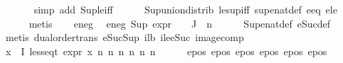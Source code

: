 \begin{isabellebody}
\ \ \ \ \ \isamarkupfalse%
\ {\isacharparenleft}{\kern0pt}simp\ add{\isacharcolon}{\kern0pt}\ Sup{\isacharunderscore}{\kern0pt}le{\isacharunderscore}{\kern0pt}iff{\isacharparenright}{\kern0pt}\isanewline
\ \ \ \ \isamarkupfalse%
\ Sup{\isacharunderscore}{\kern0pt}union{\isacharunderscore}{\kern0pt}distrib\ le{\isacharunderscore}{\kern0pt}sup{\isacharunderscore}{\kern0pt}iff\ sup{\isacharunderscore}{\kern0pt}enat{\isacharunderscore}{\kern0pt}def\ e{}{\isacharunderscore}{\kern0pt}eq\ e{}{\isacharunderscore}{\kern0pt}le\isanewline
\ \ \ \ \isamarkupfalse%
\ metis\isanewline
\isanewline
\ \ \isamarkupfalse%
\ e{}{\isacharunderscore}{\kern0pt}neg\ \isamarkupfalse%
\ e{}{\isacharunderscore}{\kern0pt}neg{\isacharcolon}{\kern0pt}\ {\isachardoublequoteopen}Sup\ {\isacharparenleft}{\kern0pt}{\isacharparenleft}{\kern0pt}expr{\isacharunderscore}{\kern0pt}{}\ {\isasymcirc}\ {\isasymPhi}{\isacharparenright}{\kern0pt}\ {\isacharbackquote}{\kern0pt}\ J{\isacharparenright}{\kern0pt}\ {\isasymle}\ n{}{\isachardoublequoteclose}\isanewline
\ \ \ \ \isamarkupfalse%
\ Sup{\isacharunderscore}{\kern0pt}enat{\isacharunderscore}{\kern0pt}def\ eSuc{\isacharunderscore}{\kern0pt}def\isanewline
\ \ \ \ \isamarkupfalse%
\ {\isacharparenleft}{\kern0pt}metis\ dual{\isacharunderscore}{\kern0pt}order{\isachardot}{\kern0pt}trans\ eSuc{\isacharunderscore}{\kern0pt}Sup\ i{}{\isacharunderscore}{\kern0pt}lb\ ile{\isacharunderscore}{\kern0pt}eSuc\ image{\isacharunderscore}{\kern0pt}comp{\isacharparenright}{\kern0pt}\isanewline
\isanewline
\isanewline
\ \ \isamarkupfalse%
\ {\isachardoublequoteopen}{\isasymforall}x{\isasymin}{\isasymPhi}\ {\isacharbackquote}{\kern0pt}\ I{\isachardot}{\kern0pt}\ less{\isacharunderscore}{\kern0pt}eq{\isacharunderscore}{\kern0pt}t\ {\isacharparenleft}{\kern0pt}expr\ x{\isacharparenright}{\kern0pt}\ {\isacharparenleft}{\kern0pt}n{}{\isacharcomma}{\kern0pt}\ n{}{\isacharcomma}{\kern0pt}\ n{}{\isacharcomma}{\kern0pt}\ n{}{\isacharcomma}{\kern0pt}\ n{}{\isacharcomma}{\kern0pt}\ n{}{\isacharparenright}{\kern0pt}{\isachardoublequoteclose}\isanewline
\ \ \ \ \isamarkupfalse%
\ e{}{\isacharunderscore}{\kern0pt}pos\ e{}{\isacharunderscore}{\kern0pt}pos\ e{}{\isacharunderscore}{\kern0pt}pos\ e{}{\isacharunderscore}{\kern0pt}pos\ e{}{\isacharunderscore}{\kern0pt}pos\ e{}{\isacharunderscore}{\kern0pt}pos\isanewline

\end{isabellebody}
